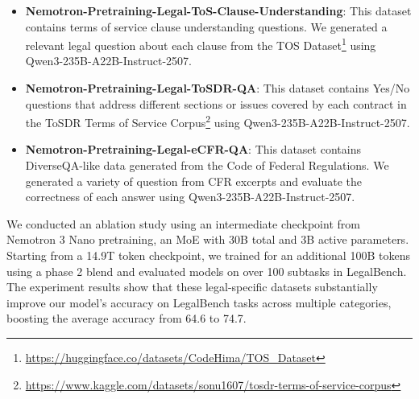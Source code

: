 \begin{itemize}
\begin{itemize}
        \item \textbf{Nemotron-Pretraining-Legal-ToS-Clause-Understanding}: This dataset contains terms of service clause understanding questions. We generated a relevant legal question about each clause from the TOS Dataset\footnote{\url{https://huggingface.co/datasets/CodeHima/TOS_Dataset}} using Qwen3-235B-A22B-Instruct-2507.
        \item \textbf{Nemotron-Pretraining-Legal-ToSDR-QA}: This dataset contains Yes/No questions that address different sections or issues covered by each contract in the ToSDR Terms of Service Corpus\footnote{\url{https://www.kaggle.com/datasets/sonu1607/tosdr-terms-of-service-corpus}} using Qwen3-235B-A22B-Instruct-2507.
        \item \textbf{Nemotron-Pretraining-Legal-eCFR-QA}: This dataset contains DiverseQA-like data generated from the Code of Federal Regulations. We generated a variety of question from CFR excerpts and evaluate the correctness of each answer using Qwen3-235B-A22B-Instruct-2507.
    \end{itemize}

\end{itemize}

We conducted an ablation study using an intermediate checkpoint from Nemotron 3 Nano pretraining, an MoE with 30B total and 3B active parameters. Starting from a 14.9T token checkpoint, we trained for an additional 100B tokens using a phase 2 blend and evaluated models on over 100 subtasks in LegalBench. The experiment results show that these legal-specific datasets substantially improve our model’s accuracy on LegalBench tasks across multiple categories, boosting the average accuracy from 64.6 to 74.7.



